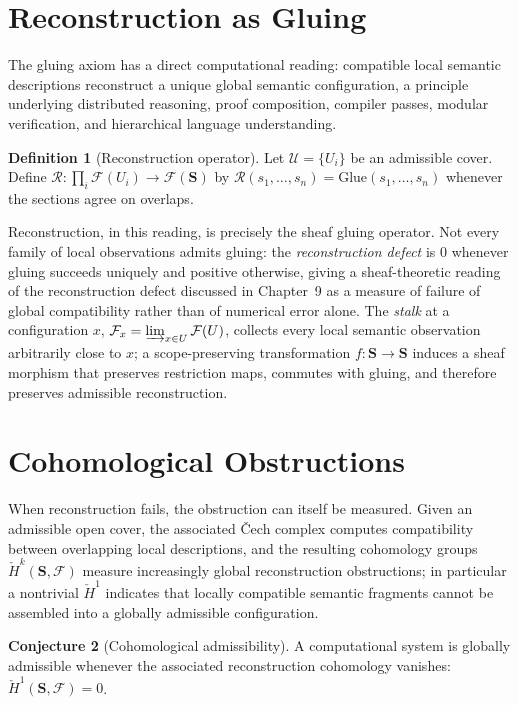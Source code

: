 \documentclass[11pt,twoside,openright]{book}
\numberwithin{equation}{chapter}
\theoremstyle{definition}
\newtheorem{definition}{Definition}[chapter]
\theoremstyle{plain}
\theoremstyle{remark}
\theoremstyle{definition}
\newtheorem{conjecture}[definition]{Conjecture}
\newcommand{\Scope}{\mathbf{S}}
\begin{document}
\section{Reconstruction as Gluing}

The gluing axiom has a direct computational reading: compatible local
semantic descriptions reconstruct a unique global semantic configuration,
a principle underlying distributed reasoning, proof composition, compiler
passes, modular verification, and hierarchical language understanding.

\begin{definition}[Reconstruction operator]
Let $\mathcal{U}=\{U_i\}$ be an admissible cover. Define
$\mathcal{R}:\prod_i\mathcal{F}(U_i)\to\mathcal{F}(\Scope)$ by
$\mathcal{R}(s_1,\ldots,s_n)=\mathrm{Glue}(s_1,\ldots,s_n)$ whenever the
sections agree on overlaps.
\end{definition}

Reconstruction, in this reading, is precisely the sheaf gluing operator.
Not every family of local observations admits gluing: the
\emph{reconstruction defect} is $0$ whenever gluing succeeds uniquely and
positive otherwise, giving a sheaf-theoretic reading of the reconstruction
defect discussed in Chapter~9 as a measure of failure of global
compatibility rather than of numerical error alone. The \emph{stalk} at a
configuration $x$, $\mathcal{F}_x=\varinjlim_{x\in U}\mathcal{F}(U)$,
collects every local semantic observation arbitrarily close to $x$; a
scope-preserving transformation $f:\Scope\to\Scope$ induces a sheaf
morphism that preserves restriction maps, commutes with gluing, and
therefore preserves admissible reconstruction.

\section{Cohomological Obstructions}

When reconstruction fails, the obstruction can itself be measured. Given
an admissible open cover, the associated \v{C}ech complex computes
compatibility between overlapping local descriptions, and the resulting
cohomology groups $\check{H}^k(\Scope,\mathcal{F})$ measure increasingly
global reconstruction obstructions; in particular a nontrivial
$\check{H}^1$ indicates that locally compatible semantic fragments cannot
be assembled into a globally admissible configuration.

\begin{conjecture}[Cohomological admissibility]
A computational system is globally admissible whenever the associated
reconstruction cohomology vanishes: $\check{H}^1(\Scope,\mathcal{F})=0$.
\end{conjecture}
\end{document}
